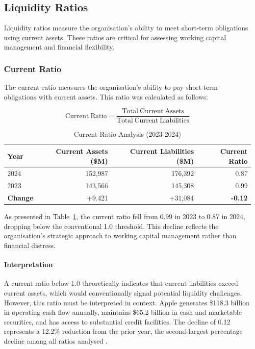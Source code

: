 \documentclass[12pt,a4paper]{article}
\begin{document}
\subsection{Liquidity Ratios}

Liquidity ratios measure the organisation's ability to meet short-term obligations using current assets. These ratios are critical for assessing working capital management and financial flexibility.

\subsubsection{Current Ratio}

The current ratio measures the organisation's ability to pay short-term obligations with current assets. This ratio was calculated as follows:

\begin{equation}
\mathrm{Current\ Ratio} = \frac{\mathrm{Total\ Current\ Assets}}{\mathrm{Total\ Current\ Liabilities}}
\end{equation}

\begin{table}[H]
\centering
\caption{Current Ratio Analysis (2023-2024)}
\label{tab:current_ratio}
\begin{tabular}{lrrr}
\toprule
\textbf{Year} & \textbf{Current Assets (\$M)} & \textbf{Current Liabilities (\$M)} & \textbf{Current Ratio} \\
\midrule
2024 & 152,987 & 176,392 & 0.87 \\
2023 & 143,566 & 145,308 & 0.99 \\
\textbf{Change} & +9,421 & +31,084 & \textbf{-0.12} \\
\bottomrule
\end{tabular}
\end{table}

As presented in Table~\ref{tab:current_ratio}, the current ratio fell from 0.99 in 2023 to 0.87 in 2024, dropping below the conventional 1.0 threshold. This decline reflects the organisation's strategic approach to working capital management rather than financial distress.

\paragraph{Interpretation}

A current ratio below 1.0 theoretically indicates that current liabilities exceed current assets, which would conventionally signal potential liquidity challenges. However, this ratio must be interpreted in context. Apple generates \$118.3 billion in operating cash flow annually, maintains \$65.2 billion in cash and marketable securities, and has access to substantial credit facilities. The decline of 0.12 represents a 12.2\% reduction from the prior year, the second-largest percentage decline among all ratios analysed \citep{apple202410k}.
\end{document}
